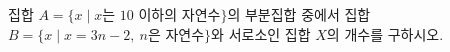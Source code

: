 집합 $A=\{x \mid x$는 $10$ 이하의 자연수$\}$의 부분집합 중에서 집합 $B=\{x \mid x=3n-2,\ n$은 자연수$\}$와 서로소인 집합 $X$의 개수를 구하시오.
